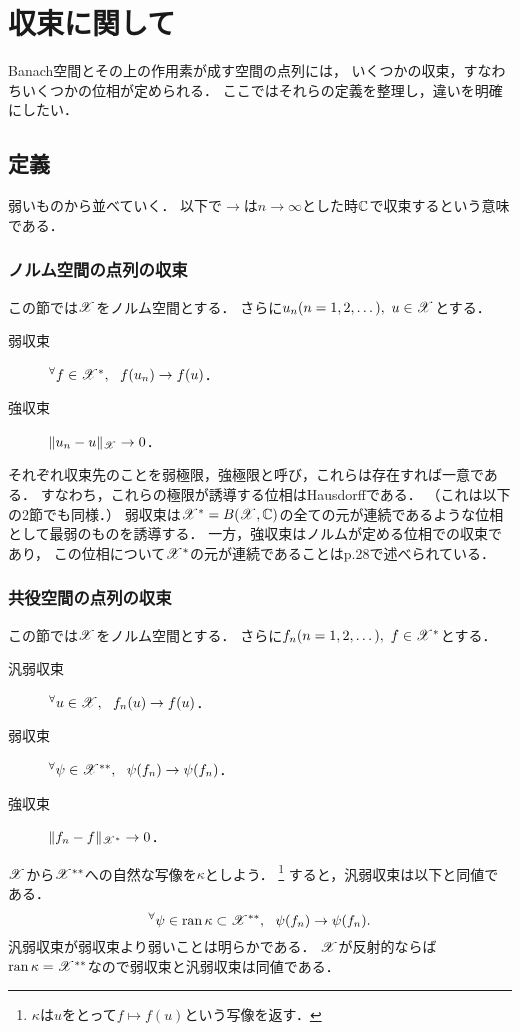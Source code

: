 \section{収束に関して}
    Banach空間とその上の作用素が成す空間の点列には，
    いくつかの収束，すなわちいくつかの位相が定められる．
    ここではそれらの定義を整理し，違いを明確にしたい．
    \subsection{定義}
    弱いものから並べていく．
    以下で$\to$は$n \to \infty$とした時$\mathbb{C}$で収束するという意味である．
    \newpage
    \subsubsection{ノルム空間の点列の収束}
    この節では$\mathscr{X}$をノルム空間とする．
    さらに$u_n (n=1,2,\dots),~ u \in \mathscr{X}$とする．
    \begin{description}
        \item[弱収束] ${}^{\forall} f \in \mathscr{X}^*,~~ f(u_n) \to f(u)$．
        \item[強収束] $\|u_n-u\|_{\mathscr{X}} \to 0$．
    \end{description}
    それぞれ収束先のことを弱極限，強極限と呼び，これらは存在すれば一意である．
    すなわち，これらの極限が誘導する位相はHausdorffである．
    （これは以下の2節でも同様．）
    弱収束は$\mathscr{X}^*=B(\mathscr{X},\mathbb{C})$の全ての元が連続であるような位相として最弱のものを誘導する．
    一方，強収束はノルムが定める位相での収束であり，
    この位相について$\mathscr{X}^*$の元が連続であることはp.28で述べられている．

    \subsubsection{共役空間の点列の収束}
    この節では$\mathscr{X}$をノルム空間とする．
    さらに$f_n (n=1,2,\dots),~ f \in \mathscr{X}^*$とする．
    \begin{description}
        \item[汎弱収束] ${}^{\forall} u \in \mathscr{X},~~ f_n(u) \to f(u)$．
        \item[弱収束]\hspace{0.6em} ${}^{\forall} \psi \in \mathscr{X}^{**},~~ \psi(f_n) \to \psi(f_n)$．
        \item[強収束]\hspace{0.6em} $\|f_n-f\|_{\mathscr{X}^*} \to 0$．
    \end{description}
    $\mathscr{X}$から$\mathscr{X}^{**}$への自然な写像を$\kappa$としよう．
    \footnote{$\kappa$は$u$をとって$f \mapsto f(u)$という写像を返す．}
    すると，汎弱収束は以下と同値である．
    \[ {}^{\forall} \psi \in \operatorname{ran} \kappa \subset \mathscr{X}^{**},~~ \psi(f_n) \to \psi(f_n). \]
    汎弱収束が弱収束より弱いことは明らかである．
    $\mathscr{X}$が反射的ならば$\operatorname{ran} \kappa=\mathscr{X}^{**}$なので弱収束と汎弱収束は同値である．
        

